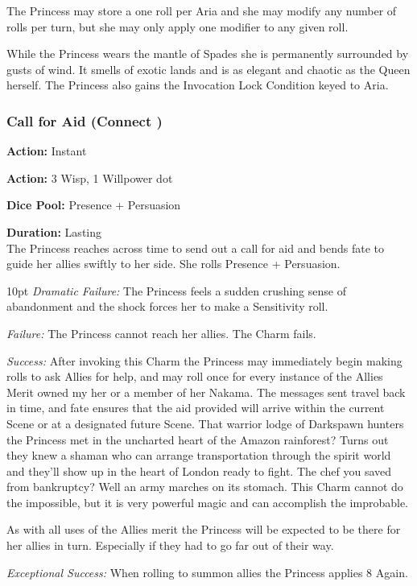 The Princess may store a one roll per Aria and she may modify any number of rolls per turn, but she may only apply one modifier to any given roll. 

While the Princess wears the mantle of Spades she is permanently surrounded by gusts of wind. It smells of exotic lands and is as elegant and chaotic as the Queen herself. The Princess also gains the Invocation Lock Condition keyed to Aria.

\subsubsection*{Call for Aid (Connect \textbullet\textbullet\textbullet\textbullet\textbullet)}

\noindent \textbf{Action:} Instant

\noindent \textbf{Action:} 3 Wisp, 1 Willpower dot

\noindent \textbf{Dice Pool:} Presence + Persuasion

\noindent \textbf{Duration:} Lasting \\

\noindent The Princess reaches across time to send out a call for aid and bends fate to guide her allies swiftly to her side. She rolls Presence + Persuasion.

\begin{myindentpar}{10pt}    \emph{Dramatic Failure:} The Princess feels a sudden crushing sense of abandonment and the shock forces her to make a Sensitivity roll. 

    \emph{Failure:} The Princess cannot reach her allies. The Charm fails.

    \emph{Success:} After invoking this Charm the Princess may immediately begin making rolls to ask Allies for help, and may roll once for every instance of the Allies Merit owned my her or a member of her Nakama. The messages sent travel back in time, and fate ensures that the aid provided will arrive within the current Scene or at a designated future Scene. That warrior lodge of Darkspawn hunters the Princess met in the uncharted heart of the Amazon rainforest? Turns out they knew a shaman who can arrange transportation through the spirit world and they'll show up in the heart of London ready to fight. The chef you saved from bankruptcy? Well an army marches on its stomach. This Charm cannot do the impossible, but it is very powerful magic and can accomplish the improbable. 
	
	As with all uses of the Allies merit the Princess will be expected to be there for her allies in turn. Especially if they had to go far out of their way. 

    \emph{Exceptional Success:} When rolling to summon allies the Princess applies 8 Again. \end{myindentpar}
	
